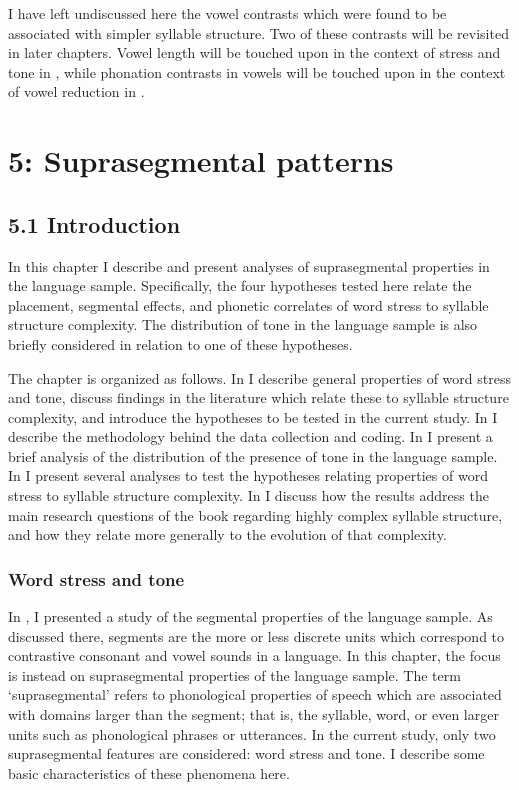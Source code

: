   I have left undiscussed here the vowel contrasts which were found to be associated with simpler syllable structure. Two of these contrasts will be revisited in later chapters. Vowel length will be touched upon in the context of stress and tone in , while phonation contrasts in vowels will be touched upon in the context of vowel reduction in .

\chapter{5: Suprasegmental patterns}
\section{\textbf{5.1} \textbf{Introduction}}

  In this chapter I describe and present analyses of suprasegmental properties in the language sample. Specifically, the four hypotheses tested here relate the placement, segmental effects, and phonetic correlates of word stress to syllable structure complexity. The distribution of tone in the language sample is also briefly considered in relation to one of these hypotheses.

  The chapter is organized as follows. In  I describe general properties of word stress and tone, discuss findings in the literature which relate these to syllable structure complexity, and introduce the hypotheses to be tested in the current study. In  I describe the methodology behind the data collection and coding. In  I present a brief analysis of the distribution of the presence of tone in the language sample. In  I present several analyses to test the hypotheses relating properties of word stress to syllable structure complexity. In  I discuss how the results address the main research questions of the book regarding highly complex syllable structure, and how they relate more generally to the evolution of that complexity.

\subsection{Word stress and tone}\label{sec:5.1.1}

  In , I presented a study of the segmental properties of the language sample. As discussed there, segments are the more or less discrete units which correspond to contrastive consonant and vowel sounds in a language. In this chapter, the focus is instead on suprasegmental properties of the language sample. The term ‘suprasegmental’ refers to phonological properties of speech which are associated with domains larger than the segment; that is, the syllable, word, or even larger units such as phonological phrases or utterances. In the current study, only two suprasegmental features are considered: word stress and tone. I describe some basic characteristics of these phenomena here.

